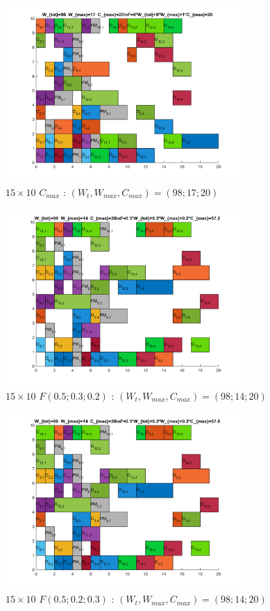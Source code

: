 \documentclass[10pt,a4paper]{scrartcl}
\begin{document}
\begin{figure}
  \centering
  \includegraphics[width=0.8\textwidth]{img/results15x10_Cmax.png}
  \caption{$15 \times 10$ $C_{max}$ : $(W_t, W_{max}, C_{max}) = (98; 17; 20)$}
\end{figure}
\begin{figure}
  \centering
  \includegraphics[width=0.8\textwidth]{img/results15x10_F050302.png}
  \caption{$15 \times 10$ $F(0.5;0.3;0.2)$ : $(W_t, W_{max}, C_{max}) = (98; 14; 20)$}
\end{figure}
\begin{figure}
  \centering
  \includegraphics[width=0.8\textwidth]{img/results15x10_F050203.png}
  \caption{$15 \times 10$ $F(0.5;0.2;0.3)$ : $(W_t, W_{max}, C_{max}) = (98; 14; 20)$}
\end{figure}
\end{document}
